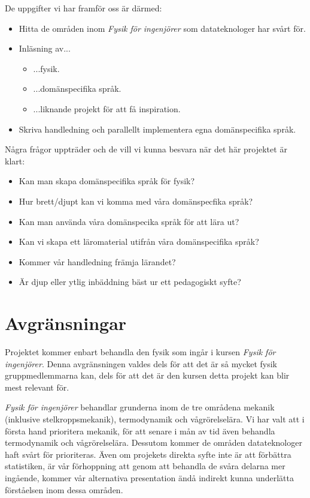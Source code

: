 \documentclass[12pt,a4paper]{article}
\begin{document}
De uppgifter vi har framför oss är därmed:

\begin{itemize}
	\item Hitta de områden inom \textit{Fysik för ingenjörer} som datateknologer har svårt för.
	\item Inläsning av...
	\begin{itemize}
		\item ...fysik.
		\item ...domänspecifika språk.
		\item ...liknande projekt för att få inspiration.
	\end{itemize}
	\item Skriva handledning och parallellt implementera egna domänspecifika språk.
\end{itemize}


Några frågor uppträder och de vill vi kunna besvara när det här projektet är klart:
\begin{itemize}
    \item Kan man skapa domänspecifika språk för fysik?
    \item Hur brett/djupt kan vi komma med våra domänspecfika språk?
    \item Kan man använda våra domänspecika språk för att lära ut?
    \item Kan vi skapa ett läromaterial utifrån våra domänspecifika språk?
    \item Kommer vår handledning främja lärandet?
    \item Är djup eller ytlig inbäddning bäst ur ett pedagogiskt syfte?
\end{itemize}

\section{Avgränsningar}

Projektet kommer enbart behandla den fysik som ingår i kursen \textit{Fysik för ingenjörer}. Denna avgränsningen valdes dels för att det är så mycket fysik gruppmedlemmarna kan, dels för att det är den kursen detta projekt kan blir mest relevant för.

\textit{Fysik för ingenjörer} behandlar grunderna inom de tre områdena mekanik (inklusive stelkroppsmekanik), termodynamik och vågrörelselära. Vi har valt att i första hand prioritera mekanik, för att senare i mån av tid även behandla termodynamik och vågrörelselära. Dessutom kommer de områden datateknologer haft svårt för prioriteras. Även om projekets direkta syfte inte är att förbättra statistiken, är vår förhoppning att genom att behandla de svåra delarna mer ingående, kommer vår alternativa presentation ändå indirekt kunna underlätta förståelsen inom dessa områden.
\end{document}
